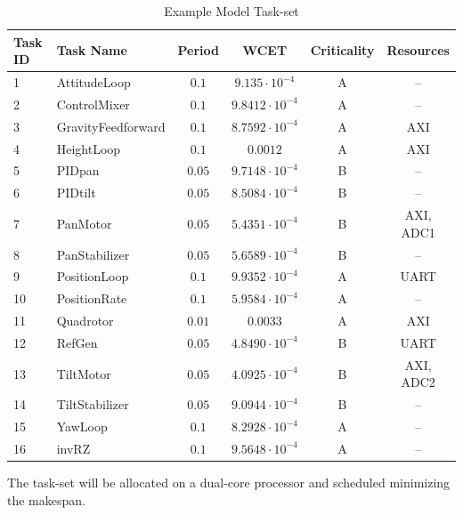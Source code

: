 \begin{table}
\begin{center}
\begin{tabular}{llcccc}  
\toprule
Task ID & Task Name    & Period & WCET & Criticality & Resources \\
\midrule
1  & AttitudeLoop      	& $0.1$  &	$9.135\cdot10^{-4}$     & A	& --\\
2  & ControlMixer     	& $0.1$  & 	$9.8412\cdot10^{-4}$    & A	& --\\
3  & GravityFeedforward & $0.1$  & 	$8.7592\cdot10^{-4}$    & A	& AXI \\
4  & HeightLoop      	& $0.1$  & 	$0.0012$			    & A	& AXI \\
5  & PIDpan      		& $0.05$ & 	$9.7148\cdot10^{-4}$    & B	& --\\
6  & PIDtilt      		& $0.05$ & 	$8.5084\cdot10^{-4}$    & B	& --\\
7  & PanMotor      		& $0.05$ & 	$5.4351\cdot10^{-4}$    & B	& AXI, ADC1\\
8  & PanStabilizer     	& $0.05$ &	$5.6589\cdot10^{-4}$    & B	& --\\
9  & PositionLoop      	& $0.1$  & 	$9.9352\cdot10^{-4}$    & A	& UART \\
10 & PositionRate      	& $0.1$  & 	$5.9584\cdot10^{-4}$    & A	& --\\
11 & Quadrotor      	& $0.01$ & 	$0.0033$			    & A	& AXI \\
12 & RefGen      		& $0.05$ & 	$4.8490\cdot10^{-4}$    & B	& UART \\
13 & TiltMotor      	& $0.05$ &	$4.0925\cdot10^{-4}$    & B	& AXI, ADC2\\
14 & TiltStabilizer     & $0.05$ & 	$9.0944\cdot10^{-4}$    & B	& --\\
15 & YawLoop      		& $0.1$  &	$8.2928\cdot10^{-4}$    & A	& --\\
16 & invRZ      		& $0.1$  &	$9.5648\cdot10^{-4}$    & A	& --\\
\bottomrule
\end{tabular}
\caption {Example Model Task-set}
\label{tab:taskset}
\end{center}
\end{table}
The task-set will be allocated on a dual-core processor and scheduled minimizing the makespan.

